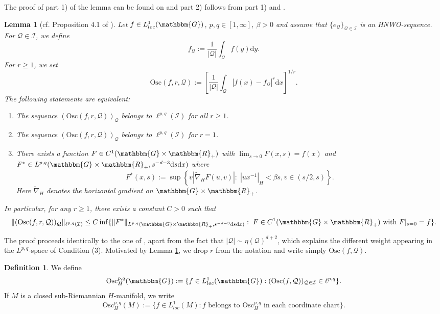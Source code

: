 \documentclass[10pt]{amsart}
\newtheorem{lem}[thm]{Lemma}
\theoremstyle{remark}
\theoremstyle{definition}
\newtheorem{deef}[thm]{Definition}
\begin{document}
The proof of part 1) of the lemma can be found on \cite[page 241]{rochbergsemmes} and part 2) follows from part 1) and \cite[Lemma 1.16]{rochbergsemmes}.

\begin{lem}[cf. Proposition 4.1 of \cite{rochbergsemmes}]
\label{threeeq}
Let $f\in L^1_{loc}(\mathbbm{G})$, $p,q\in [1,\infty]$, $\beta>0$ and assume that $\{e_\mathcal{Q}\}_{\mathcal{Q}\in \mathcal{I}}$ is an HNWO-sequence. For $\mathcal{Q}\in \mathcal{I}$, we define 
$$f_\mathcal{Q}:=\frac{1}{|\mathcal{Q}|}\int_\mathcal{Q}f(y){\mathrm{d}} y.$$
For $r\geq 1$, we set
$$\mathrm{Osc}(f,r,\mathcal{Q}):=\left[\frac{1}{|\mathcal{Q}|}\int_\mathcal{Q}|f(x)-f_\mathcal{Q}|^r{\mathrm{d}} x\right]^{1/r}.$$
The following statements are equivalent:
\begin{enumerate}
\item The sequence $(\mathrm{Osc}(f,r,\mathcal{Q}))_{\mathcal{Q}}$ belongs to $\ell^{p,q}(\mathcal{I})$ for all $r\geq 1$.
\item The sequence $(\mathrm{Osc}(f,r,\mathcal{Q}))_{\mathcal{Q}}$ belongs to $\ell^{p,q}(\mathcal{I})$ for $r= 1$.
\item There exists a function $F\in C^1(\mathbbm{G}\times {\mathbbm{R}}_+)$ with $\lim_{s\to 0} F(x,s)=f(x)$ and $F^*\in L^{p,q}(\mathbbm{G}\times {\mathbbm{R}}_+, s^{-d-3}{\mathrm{d}} s{\mathrm{d}} x)$ where
$$F^*(x,s):= \sup\left\{v|\tilde{\nabla}_H F(u,v)|: \; |ux^{-1}|_H<\beta s, v\in \left(s/2,s\right)\right\}.$$
Here $\tilde{\nabla}_H$ denotes the horizontal gradient on $\mathbbm{G}\times {\mathbbm{R}}_+$.
\end{enumerate}
In particular, for any $r\geq 1$, there exists a constant $C>0$ such that 
$$\|(\mathrm{Osc}(f,r,\mathcal{Q}))_{\mathcal{Q}}\|_{\ell^{p,q}(\mathcal{I})}\leq C \inf\{\|F^*\|_{L^{p,q}(\mathbbm{G}\times {\mathbbm{R}}_+, s^{-d-3}{\mathrm{d}} s{\mathrm{d}} x)}: \;F\in C^1(\mathbbm{G}\times {\mathbbm{R}}_+)\mbox{   with   } F|_{s=0}=f\}.$$
\end{lem}

The proof proceeds identically to the one of \cite[Proposition 4.1]{rochbergsemmes}, apart from the fact that $|\mathcal{Q}|\sim \eta(\mathcal{Q})^{d+2}$, which explains the different weight appearing in the $L^{p,q}$-space of Condition (3). Motivated by Lemma \ref{threeeq}, we drop $r$ from the notation and write simply $\mathrm{Osc}(f,\mathcal{Q})$.

\begin{deef}
We define
$$\mathrm{Osc}^{p,q}_H(\mathbbm{G}):=\{f\in L^1_{loc}(\mathbbm{G}): (\mathrm{Osc}(f,\mathcal{Q}))_{\mathcal{Q}\in \mathcal{I}}\in \ell^{p,q}\}.$$
If $M$ is a closed sub-Riemannian $H$-manifold, we write 
$$\mathrm{Osc}^{p,q}_H(M):=\{f\in L^1_{loc}(M): f \mbox{    belongs to $\mathrm{Osc}^{p,q}_H$ in each coordinate chart}\}.$$
\end{deef}
\end{document}
